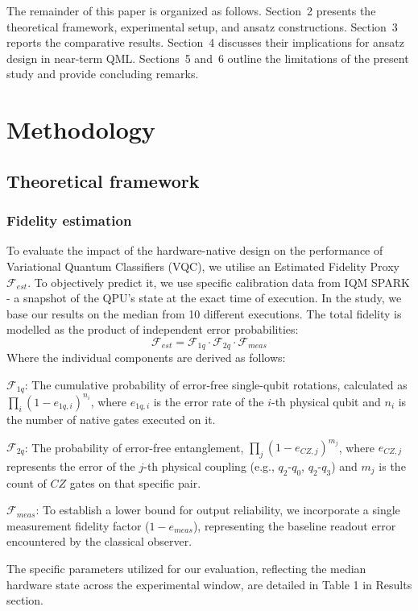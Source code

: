 \documentclass[11pt]{article}
\begin{document}
The remainder of this paper is organized as follows. Section~2 presents the theoretical framework, experimental setup, and ansatz constructions. Section~3 reports the comparative results. Section~4 discusses their implications for ansatz design in near-term QML. Sections~5 and~6 outline the limitations of the present study and provide concluding remarks.

\section{Methodology}
\subsection{Theoretical framework}
\subsubsection{Fidelity estimation}
To evaluate the impact of the hardware-native design on the performance of Variational Quantum Classifiers (VQC), we utilise an Estimated Fidelity Proxy $\mathcal{F}_{est}$. To objectively predict it, we use specific calibration data from IQM SPARK - a snapshot of the QPU's state at the exact time of execution. In the study, we base our results on the median from 10 different executions. The total fidelity is modelled as the product of independent error probabilities:$$\mathcal{F}_{est} = \mathcal{F}_{1q} \cdot \mathcal{F}_{2q} \cdot \mathcal{F}_{meas}$$Where the individual components are derived as follows:

$\mathcal{F}_{1q}$: The cumulative probability of error-free single-qubit rotations, calculated as $\prod_{i} (1 - e_{1q, i})^{n_i}$, where $e_{1q, i}$ is the error rate of the $i$-th physical qubit and $n_i$ is the number of native gates executed on it.

$\mathcal{F}_{2q}$: The probability of error-free entanglement, $\prod_{j} (1 - e_{CZ, j})^{m_j}$, where $e_{CZ, j}$ represents the error of the $j$-th physical coupling (e.g., $q_2$-$q_0$, $q_2$-$q_3$) and $m_j$ is the count of $CZ$ gates on that specific pair.

$\mathcal{F}_{meas}$: To establish a lower bound for output reliability, we incorporate a single measurement fidelity factor ($1 - e_{meas}$), representing the baseline readout error encountered by the classical observer.

The specific parameters utilized for our evaluation, reflecting the median hardware state across the experimental window, are detailed in Table 1 in Results section.
\end{document}
